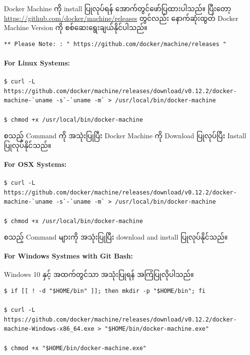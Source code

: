 \documentclass{article}
\begin{document}
Docker Machine ကို install ပြုလုပ်ရန် အောက်တွင်ဖော်ပြထားပါသည်။ ပြီးတော့
\url{https://github.com/docker/machine/releases} တွင်လည်း နောက်ဆုံးထွတ်
Docker Machine Version ကို စစ်ဆေးရွေးချယ်နိုင်ပါသည်။

\begin{verbatim}
** Please Note: : " https://github.com/docker/machine/releases " 
\end{verbatim}

\paragraph{For Linux Systems:}\label{for-linux-systems}

\begin{verbatim}
$ curl -L https://github.com/docker/machine/releases/download/v0.12.2/docker-machine-`uname -s`-`uname -m` > /usr/local/bin/docker-machine

$ chmod +x /usr/local/bin/docker-machine
\end{verbatim}

စသည့် Command ကို အသုံးပြုပြီး Docker Machine ကို Download ပြုလုပ်ပြီး
Install ပြုလုပ်နိုင်သည်။

\paragraph{For OSX Systems:}\label{for-osx-systems}

\begin{verbatim}
$ curl -L https://github.com/docker/machine/releases/download/v0.12.2/docker-machine-`uname -s`-`uname -m` > /usr/local/bin/docker-machine

$ chmod +x /usr/local/bin/docker-machine
\end{verbatim}

စသည့် Command များကို အသုံးပြုပြီး download and install ပြုလုပ်နိုင်သည်။

\paragraph{For Windows Systmes with Git
Bash:}\label{for-windows-systmes-with-git-bash}

Windows 10 နှင့် အထက်တွင်သာ အသုံးပြုရန် အကြံပြုလိုပါသည်။

\begin{verbatim}
$ if [[ ! -d "$HOME/bin" ]]; then mkdir -p "$HOME/bin"; fi

$ curl -L https://github.com/docker/machine/releases/download/v0.12.2/docker-machine-Windows-x86_64.exe > "$HOME/bin/docker-machine.exe"

$ chmod +x "$HOME/bin/docker-machine.exe"
\end{verbatim}
\end{document}
